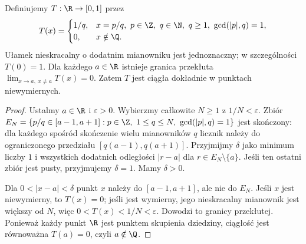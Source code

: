 \begin{przyklad}
\label{ma1:ex:thomae-riemann}
\label{ma1:ex:thomae}
Definiujemy $T:\R\to[0,1]$ przez
\[
 T(x)=
 \begin{cases}
 1/q,& x=p/q,\ p\in\Z,\ q\in\N,\ q\ge1,\ \gcd(|p|,q)=1,\\
 0,&x\notin\Q.
 \end{cases}
\]
Ułamek nieskracalny o dodatnim mianowniku jest jednoznaczny; w szczególności $T(0)=1$. Dla każdego $a\in\R$ istnieje granica przekłuta $\lim_{x\to a,\ x\ne a}T(x)=0$. Zatem $T$ jest ciągła dokładnie w punktach niewymiernych.
\end{przyklad}
\begin{proof}
Ustalmy $a\in\R$ i $\varepsilon>0$. Wybierzmy całkowite $N\ge1$ z $1/N<\varepsilon$. Zbiór
$E_N=\{p/q\in[a-1,a+1]:p\in\Z,\ 1\le q\le N,\ \gcd(|p|,q)=1\}$
jest skończony: dla każdego spośród skończenie wielu mianowników $q$ licznik należy do ograniczonego przedziału $[q(a-1),q(a+1)]$. Przyjmijmy $\delta$ jako minimum liczby $1$ i wszystkich dodatnich odległości $|r-a|$ dla $r\in E_N\setminus\{a\}$. Jeśli ten ostatni zbiór jest pusty, przyjmujemy $\delta=1$. Mamy $\delta>0$.

Dla $0<|x-a|<\delta$ punkt $x$ należy do $[a-1,a+1]$, ale nie do $E_N$. Jeśli $x$ jest niewymierny, to $T(x)=0$; jeśli jest wymierny, jego nieskracalny mianownik jest większy od $N$, więc $0<T(x)<1/N<\varepsilon$. Dowodzi to granicy przekłutej. Ponieważ każdy punkt $\R$ jest punktem skupienia dziedziny, ciągłość jest równoważna $T(a)=0$, czyli $a\notin\Q$.
\end{proof}
